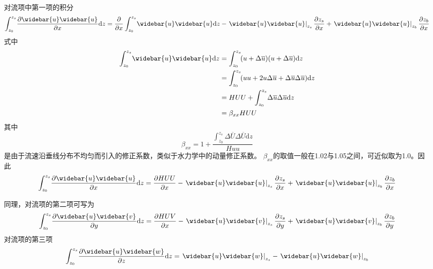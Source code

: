 对流项中第一项的积分
\begin{equation}
  \int_{z_0}^{ z_{s}}\!
  \frac{\partial \widebar{u}\widebar{u}}{\partial x}
  \mathrm{d}z
  =
  \frac{\partial}{\partial x}
  \int_{z_0}^{ z_{s}}\!
  \widebar{u}\widebar{u}
  \mathrm{d}z
  -
  \left.\widebar{u}\widebar{u}\right|_{z_{s}}\frac{\partial  z_{s}}{\partial x}
  +
  \left.\widebar{u}\widebar{u}\right|_{z_{b}}\frac{\partial z_{b}}{\partial x}
  \label{EqCGe_CT_1st}
\end{equation}
式中
\begin{equation*}
  \begin{aligned}
    \int_{z_0}^{ z_{s}}\!
    \widebar{u}\widebar{u}
    \mathrm{d}z
    &=
    \int_{z_0}^{ z_{s}}\!
    (u+\Delta\overline{u})(u+\Delta\overline{u})
    \mathrm{d}z
    \\
    &=
    \int_{z_0}^{ z_{s}}\!
    (uu+2u\Delta\overline{u}+\Delta\overline{u}\Delta\overline{u})
    \mathrm{d}z
    \\
    &=
    HUU
    +
    \int_{z_0}^{ z_{s}}\!
    \Delta\overline{u}\Delta\overline{u}
    \mathrm{d}z
    \\
    &=
    \beta_{xx}HUU
  \end{aligned}
\end{equation*}
其中
\begin{equation}
  \beta_{xx}
  =
  1 +
  \frac
  {
    \int_{z_0}^{ z_{s}}\!
    \Delta\overline{U}\Delta\overline{U}
    \mathrm{d}z
  }
  {Huu}
\end{equation}
是由于流速沿垂线分布不均匀而引入的修正系数，类似于水力学中的动量修正系数。
$\beta_{xx}$的取值一般在1.02与1.05之间，可近似取为1.0。因此
\begin{equation}
  \int_{z_0}^{ z_{s}}\!
  \frac{\partial \widebar{u}\widebar{u}}{\partial x}
  \mathrm{d}z
  =
  \frac{\partial HUU}{\partial x}
  -
  \left.\widebar{u}\widebar{u}\right|_{z_{s}}\frac{\partial  z_{s}}{\partial x}
  +
  \left.\widebar{u}\widebar{u}\right|_{z_{b}}\frac{\partial z_{b}}{\partial x}
\end{equation}

同理，对流项的第二项可写为
\begin{equation}
  \int_{z_0}^{ z_{s}}\!
  \frac{\partial \widebar{u}\widebar{v}}{\partial y}
  \mathrm{d}z
  =
  \frac{\partial HUV}{\partial x}
  -
  \left.\widebar{u}\widebar{v}\right|_{z_{s}}\frac{\partial  z_{s}}{\partial y}
  +
  \left.\widebar{u}\widebar{v}\right|_{z_{b}}\frac{\partial z_{b}}{\partial y}
\end{equation}
对流项的第三项
\begin{equation}
  \int_{z_0}^{ z_{s}}\!
  \frac{\partial \widebar{u}\widebar{w}}{\partial z}
  \mathrm{d}z
  =
  \left.\widebar{u}\widebar{w}\right|_{z_{s}}
  -
  \left.\widebar{u}\widebar{w}\right|_{z_{b}}
\end{equation}


